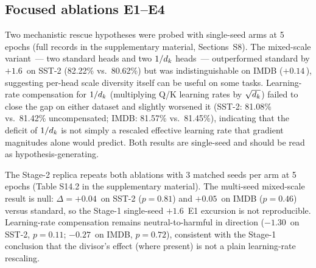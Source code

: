 \subsection{Focused ablations E1--E4}\label{sec:ablations}
Two mechanistic rescue hypotheses were probed with single-seed arms at 5 epochs
(full records in the supplementary material, Sections~S8). The mixed-scale
variant~--- two standard heads and two $1/d_k$ heads~--- outperformed standard
by $+1.6$\,\pp{} on SST-2 (82.22\% vs.\ 80.62\%) but was indistinguishable on
IMDB ($+0.14$\,\pp), suggesting per-head scale diversity itself can be useful on
some tasks. Learning-rate compensation for $1/d_k$ (multiplying Q/K learning
rates by $\sqrt{d_k}$) failed to close the gap on either dataset and slightly
worsened it (SST-2: 81.08\% vs.\ 81.42\% uncompensated; IMDB: 81.57\% vs.\
81.45\%), indicating that the deficit of $1/d_k$ is not simply a rescaled
effective learning rate that gradient magnitudes alone would predict. Both
results are single-seed and should be read as hypothesis-generating.

The Stage-2 replica repeats both ablations with 3 matched seeds per arm at 5
epochs (Table S14.2 in the supplementary material). The multi-seed
mixed-scale result is null: $\Delta = +0.04$\,\pp{} on SST-2 ($p = 0.81$) and
$+0.05$\,\pp{} on IMDB ($p = 0.46$) versus standard, so the Stage-1 single-seed
$+1.6$\,\pp{} E1 excursion is not reproducible. Learning-rate compensation
remains neutral-to-harmful in direction ($-1.30$\,\pp{} on SST-2, $p = 0.11$;
$-0.27$\,\pp{} on IMDB, $p = 0.72$), consistent with the Stage-1 conclusion that
the divisor's effect (where present) is not a plain learning-rate rescaling.

